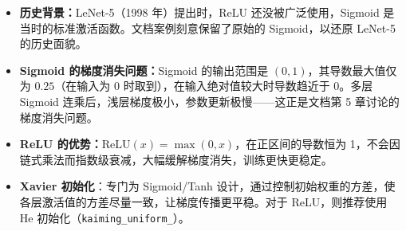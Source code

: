 \documentclass[a4paper,11pt]{ctexart}
\begin{document}
\begin{beginnerbox}
    \begin{itemize}
        \item \textbf{历史背景：}LeNet-5（1998 年）提出时，ReLU 还没被广泛使用，Sigmoid 是当时的标准激活函数。文档案例刻意保留了原始的 Sigmoid，以还原 LeNet-5 的历史面貌。
        \item \textbf{Sigmoid 的梯度消失问题：}Sigmoid 的输出范围是 $(0,1)$，其导数最大值仅为 $0.25$（在输入为 0 时取到），在输入绝对值较大时导数趋近于 0。多层 Sigmoid 连乘后，浅层梯度极小，参数更新极慢——这正是文档第 5 章讨论的梯度消失问题。
        \item \textbf{ReLU 的优势：}$\text{ReLU}(x) = \max(0,x)$，在正区间的导数恒为 1，不会因链式乘法而指数级衰减，大幅缓解梯度消失，训练更快更稳定。
        \item \textbf{Xavier 初始化}：专门为 Sigmoid/Tanh 设计，通过控制初始权重的方差，使各层激活值的方差尽量一致，让梯度传播更平稳。对于 ReLU，则推荐使用 He 初始化（\texttt{kaiming\_uniform\_}）。
    \end{itemize}
\end{beginnerbox}
\end{document}
